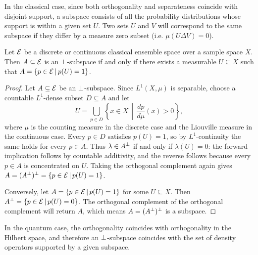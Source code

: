 In the classical case, since both orthogonality and separateness coincide with disjoint support, a subspace consists of all the probability distributions whose support is within a given set $U$. Two sets $U$ and $V$ will correspond to the same subspace if they differ by a measure zero subset (i.e. $\mu(U\Delta V)=0$).

\begin{mathSection}
	\begin{prop}
		Let $\mathcal{E}$ be a discrete or continuous classical ensemble space over a sample space $X$. Then $A \subseteq \mathcal{E}$ is an $\perp$-subspace if and only if there exists a measurable $U \subseteq X$ such that $A = \{ p \in \mathcal{E} \, | \, p(U) = 1\}$.
	\end{prop}
	
	\begin{proof}
		Let $A \subseteq \mathcal{E}$ be an $\perp$-subspace. Since $L^1(X,\mu)$ is separable, choose a countable $L^1$-dense subset $D \subseteq A$ and let
		\begin{equation}
			U = \bigcup_{p \in D} \left\{x \in X \, \middle| \, \frac{dp}{d\mu}(x)>0\right\},
		\end{equation}
		where $\mu$ is the counting measure in the discrete case and the Liouville measure in the continuous case. Every $p \in D$ satisfies $p(U)=1$, so by $L^1$-continuity the same holds for every $p \in A$. Thus $\lambda \in A^{\perp}$ if and only if $\lambda(U)=0$: the forward implication follows by countable additivity, and the reverse follows because every $p \in A$ is concentrated on $U$. Taking the orthogonal complement again gives $A = (A^{\perp})^{\perp} = \{p \in \mathcal{E} \, | \, p(U)=1\}$.
		
		Conversely, let $A = \{ p \in \mathcal{E} \, | \, p(U) = 1\}$ for some $U \subseteq X$. Then $A^{\perp} = \{ p \in \mathcal{E} \, | \, p(U) = 0\}$. The orthogonal complement of the orthogonal complement will return $A$, which means $A = (A^{\perp})^{\perp}$ is a subspace.
	\end{proof}
\end{mathSection}

In the quantum case, the orthogonality coincides with orthogonality in the Hilbert space, and therefore an $\perp$-subspace coincides with the set of density operators supported by a given subspace.

